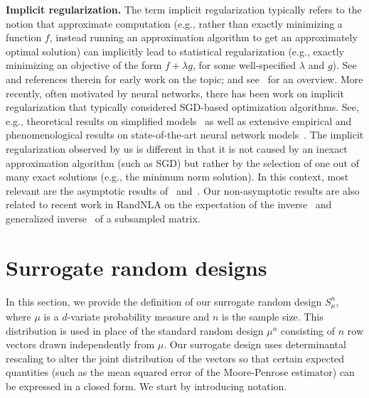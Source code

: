 \documentclass[11pt]{article}
\begin{document}
\textbf{Implicit regularization.}
The term implicit regularization typically refers to the notion that approximate
computation (e.g., rather than exactly minimizing a function $f$,
instead running an approximation algorithm to get an approximately
optimal solution) can implicitly lead to
statistical regularization (e.g., exactly minimizing an objective of
the form $f + \lambda g$, for some well-specified $\lambda$ and $g$).
See~\cite{MO11-implementing, PM11, GM14_ICML} and references therein
for early work on the topic; and see~\cite{Mah12} for an overview.
More recently, often motivated by neural networks, there has been work
on implicit regularization that typically considered SGD-based
optimization algorithms.
See, e.g., theoretical results on simplified
models~\citep{NTS14_TR,Ney17_TR,SHNx17_TR,GWBNx17,ACHL19,KBMM19_TR}
as well as extensive empirical and phenomenological results on state-of-the-art neural
network models~\citep{MM18_TR,MM19_HTSR_ICML}.
The implicit regularization observed by us is different in that it is
not caused by an inexact approximation algorithm (such as SGD) but rather by the
selection of one out of many exact solutions (e.g., the minimum norm
solution). In this context, most relevant are the
asymptotic results of~\cite{LJB19_TR} \cite[which used the asymptotic risk
results for ridge regression of][]{DW15_TR} and~\cite{KLS18_TR}.
Our non-asymptotic results are also related to recent work in
RandNLA on the expectation of the 
inverse~\citep{determinantal-averaging} and generalized
inverse~\citep{MDK19_TR} of a subsampled matrix.

\section{Surrogate random designs}
\label{s:determinantal}

In this section, we provide the definition of our surrogate random
design $S_\mu^n$, where $\mu$ is a $d$-variate probability measure and
$n$ is the sample size. This distribution is used in place
of the standard random design $\mu^n$ consisting of $n$ row vectors drawn
independently from $\mu$. Our surrogate design uses determinantal
rescaling to alter the joint distribution of the vectors so that
certain expected quantities (such as the mean squared error of the
Moore-Penrose estimator) can be expressed in a closed form.
We start by introducing notation.
\end{document}
